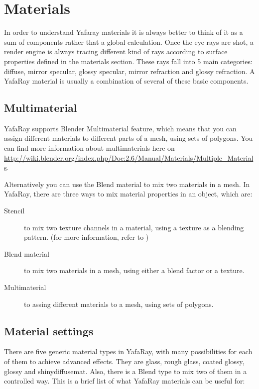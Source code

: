 \chapter{Materials} \label{chapter:materials}
In order to understand Yafaray materials it is always better to think of it as a sum of components rather that a global calculation. Once the eye rays are shot, a render engine is always tracing different kind of rays according to surface properties defined in the materials section. These rays fall into 5 main categories: diffuse, mirror specular, glossy specular, mirror refraction and glossy refraction. A YafaRay material is usually a combination of several of these basic components.

\section{Multimaterial}

YafaRay supports Blender Multimaterial feature, which means that you can assign different materials to different parts of a mesh, using sets of polygons. You can find more information about multimaterials here on \url{http://wiki.blender.org/index.php/Doc:2.6/Manual/Materials/Multiple\_Materials}.

Alternatively you can use the Blend material to mix two materials in a mesh. In YafaRay, there are three ways to mix material properties in an object, which are:

\begin{description}
\item[Stencil] to mix two texture channels in a material, using a texture as a blending pattern. (for more information, refer to )
\item[Blend material] to mix two materials in a mesh, using either a blend factor or a texture.
\item[Multimaterial] to assing different materials to a mesh, using sets of polygons.
\end{description}

\section{Material settings}

There are five generic material types in YafaRay, with many possibilities for each of them to achieve advanced effects. They are glass, rough glass, coated glossy, glossy and shinydiffusemat. Also, there is a Blend type to mix two of them in a controlled way. This is a brief list of what YafaRay materials can be useful for:

